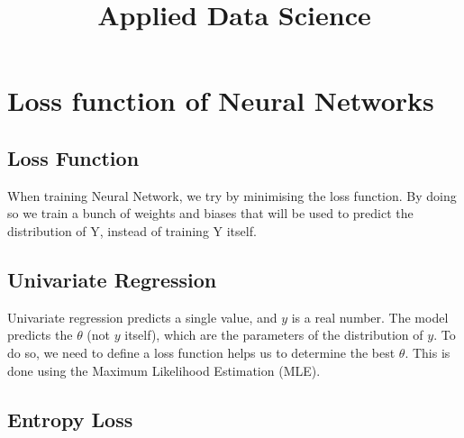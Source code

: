 \documentclass[12pt,a4paper]{article}
\newcommand{\topic}{Applied Data Science}
\begin{document}
\title{\topic}
\begin{titlepage}
    \maketitle
\end{titlepage}

\tableofcontents

\newpage
\begin{abstract}
\noindent
\end{abstract}

\section{Loss function of Neural Networks}

\subsection{Loss Function}
When training Neural Network, we try by minimising the loss function.
By doing so we train a bunch of weights and biases that will be used to predict the distribution of Y, instead of training Y itself.
\subsection{Univariate Regression}
Univariate regression predicts a single value, and $y$ is a real number.
The model predicts the $\theta$ (not $y$ itself), which are the parameters of the distribution of $y$. 
To do so, we need to define a loss function helps us to determine the best $\theta$. This is done using the Maximum Likelihood Estimation (MLE).
\subsection{Entropy Loss}
\end{document}
